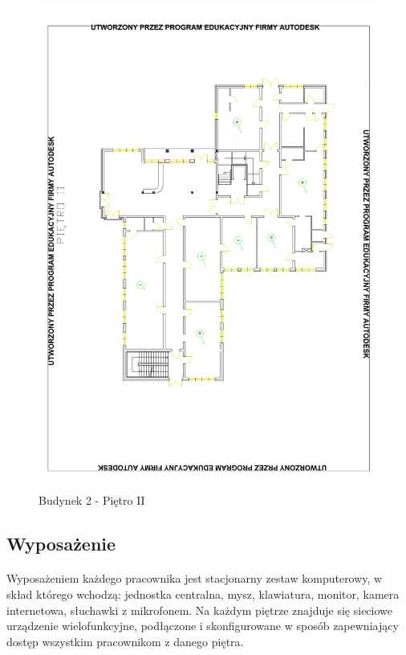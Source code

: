 \begin{figure}[H]
  \begin{center}
    \includegraphics[width=\textwidth]{img/b2-2.pdf}
    \caption{Budynek 2 - Piętro II}
  \end{center}
\end{figure}







\subsection{Wyposażenie}
\paragraph{}
Wyposażeniem każdego pracownika jest stacjonarny zestaw komputerowy, w skład którego wchodzą: jednostka centralna, mysz, klawiatura, monitor, kamera internetowa, słuchawki z mikrofonem.
Na każdym piętrze znajduje się sieciowe urządzenie wielofunkcyjne, podłączone i skonfigurowane w sposób zapewniający dostęp wszystkim pracownikom z danego piętra.

